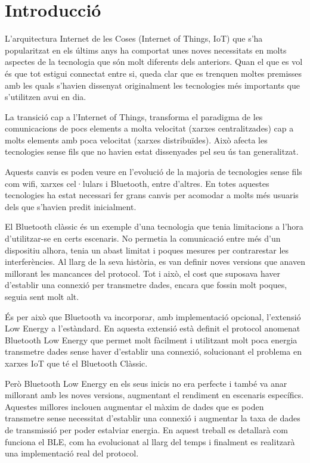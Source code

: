 \cleardoublepage
{}
\chapter*{Introducció}
L'arquitectura Internet de les Coses (Internet of Things, IoT) que s'ha popularitzat en els últims anys ha comportat unes noves necessitats en molts aspectes de la tecnologia que són molt diferents dels anteriors.
Quan el que es vol és que tot estigui connectat entre si, queda clar que es trenquen moltes premisses amb les quals s'havien dissenyat originalment les tecnologies més importants que s'utilitzen avui en dia.

La transició cap a l'Internet of Things, transforma el paradigma de les comunicacions de pocs elements a molta velocitat (xarxes centralitzades) cap a molts elements amb poca velocitat (xarxes distribuïdes).
Això afecta les tecnologies sense fils que no havien estat dissenyades pel seu ús tan generalitzat.

Aquests canvis es poden veure en l'evolució de la majoria de tecnologies sense fils com wifi, xarxes cel·lulars i Bluetooth, entre d'altres.
En totes aquestes tecnologies ha estat necessari fer grans canvis per acomodar a molts més usuaris dels que s'havien predit inicialment.

El Bluetooth clàssic és un exemple d'una tecnologia que tenia limitacions a l'hora d'utilitzar-se en certs escenaris.
No permetia la comunicació entre més d'un dispositiu alhora, tenia un abast limitat i poques mesures per contrarestar les interferències.
Al llarg de la seva història, es van definir noves versions que anaven millorant les mancances del protocol.
Tot i això, el cost que suposava haver d'establir una connexió per transmetre dades, encara que fossin molt poques, seguia sent molt alt.

És per això que Bluetooth va incorporar, amb implementació opcional, l'extensió Low Energy a l'estàndard.
En aquesta extensió està definit el protocol anomenat Bluetooth Low Energy que permet molt fàcilment i utilitzant molt poca energia transmetre dades sense haver d'establir una connexió, solucionant el problema en xarxes IoT que té el Bluetooth Clàssic.

Però Bluetooth Low Energy en els seus inicis no era perfecte i també va anar millorant amb les noves versions, augmentant el rendiment en escenaris específics.
Aquestes millores inclouen augmentar el màxim de dades que es poden transmetre sense necessitat d'establir una connexió i augmentar la taxa de dades de transmissió per poder estalviar energia.
En aquest treball es detallarà com funciona el BLE, com ha evolucionat al llarg del temps i finalment es realitzarà una implementació real del protocol.